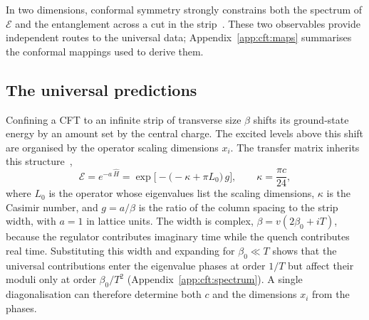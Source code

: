 In two dimensions, conformal symmetry strongly constrains both the spectrum of $\mathcal{E}$ and the entanglement across a cut in the strip~\cite{bpz1984,difrancesco1997}. These two observables provide independent routes to the universal data; Appendix~\ref{app:cft:maps} summarises the conformal mappings used to derive them.

\subsection{The universal predictions}
\label{sec:cft:temporal}
\label{sec:emergent}

Confining a \ac{CFT} to an infinite strip of transverse size $\beta$ shifts its ground-state energy by an amount set by the central charge. The excited levels above this shift are organised by the operator scaling dimensions $x_i$. The transfer matrix inherits this structure~\cite{carignano_tagliacozzo2025},
\begin{equation}
  \mathcal{E} = e^{-a\,\hat H}= \exp\!\Big[-\big(-\kappa + \pi L_0\big)\,g\Big],
  \qquad \kappa = \frac{\pi c}{24},
  \label{eq:cft:transfer}
\end{equation}
where $L_0$ is the operator whose eigenvalues list the scaling dimensions, $\kappa$ is the Casimir number, and $g=a/\beta$ is the ratio of the column spacing to the strip width, with $a=1$ in lattice units. The width is complex, $\beta=v(2\beta_0+iT)$, because the regulator contributes imaginary time while the quench contributes real time. Substituting this width and expanding for $\beta_0\ll T$ shows that the universal contributions enter the eigenvalue phases at order $1/T$ but affect their moduli only at order $\beta_0/T^2$ (Appendix~\ref{app:cft:spectrum}). A single diagonalisation can therefore determine both $c$ and the dimensions $x_i$ from the phases.

